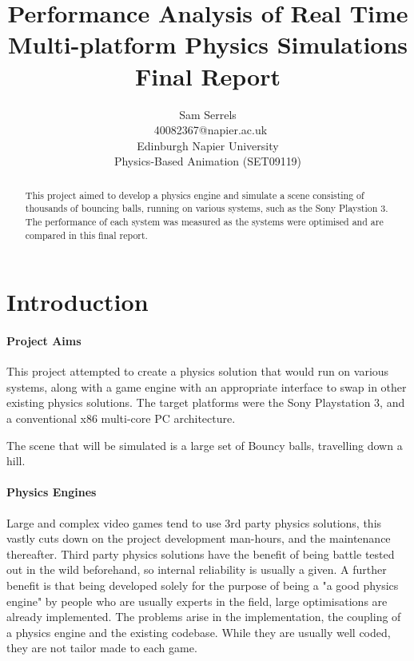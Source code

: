 \documentclass[conference]{acmsiggraph}
\title{Performance Analysis of Real Time Multi-platform Physics Simulations \\
	   Final Report}
\author{Sam Serrels\\\ 40082367@napier.ac.uk \\
Edinburgh Napier University\\
Physics-Based Animation (SET09119)}
\begin{document}

\maketitle

\begin{abstract}
This project aimed to develop a physics engine and simulate a scene consisting of thousands of bouncing balls, running on various systems, such as the Sony Playstion 3.
The performance of each system was measured as the systems were optimised and are compared in this final report.
\end{abstract}

\keywordlist

\section{Introduction}

\paragraph{Project Aims}
This project attempted to create a physics solution that would run on various systems, along with a game engine with an appropriate interface to swap in other existing physics solutions. 
The target platforms were the Sony Playstation 3, and a conventional x86 multi-core PC architecture.

The scene that will be simulated is a large set of Bouncy balls, travelling down a hill.

\paragraph{Physics Engines}
Large and complex video games tend to use 3rd party physics solutions, this vastly cuts down on the project development man-hours, and the maintenance thereafter. Third party physics solutions have the benefit of being battle tested out in the wild beforehand, so internal reliability is usually a given. A further benefit is that being developed solely for the purpose of being a "a good physics engine" by people who are usually experts in the field, large optimisations are already implemented. The problems arise in the implementation, the coupling of a physics engine and the existing codebase. While they are usually well coded, they are not tailor made to each game. 
\end{document}
